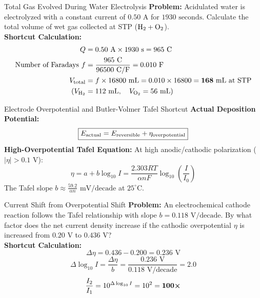 \documentclass[11pt,a4paper]{report}
\newcommand{\ans}[1]{\ifmmode\bm{#1}\else\textbf{#1}\fi}
\begin{document}
\begin{microbox}{Total Gas Evolved During Water Electrolysis}
\textbf{Problem:} Acidulated water is electrolyzed with a constant current of $0.50\text{ A}$ for $1930\text{ seconds}$. Calculate the total volume of wet gas collected at STP ($\ce{H2 + O2}$).\\
\textbf{Shortcut Calculation:}
\begin{align*}
Q &= 0.50\text{ A} \times 1930\text{ s} = 965\text{ C} \\
\text{Number of Faradays } f &= \frac{965\text{ C}}{96500\text{ C/F}} = 0.010\text{ F} \\
V_{\rm total} &= f \times 16800\text{ mL} = 0.010 \times 16800 = \ans{168\text{ mL at STP}} \\
(V_{\ce{H2}} &= 112\text{ mL}, \quad V_{\ce{O2}} = 56\text{ mL})
\end{align*}
\end{microbox}

\begin{shortcutbox}{Electrode Overpotential and Butler-Volmer Tafel Shortcut}
\textbf{Actual Deposition Potential:}
\begin{equation}
\boxed{
E_{\rm actual} = E_{\rm reversible} + \eta_{\rm overpotential}
}
\end{equation}
\textbf{High-Overpotential Tafel Equation:}
At high anodic/cathodic polarization ($|\eta| > 0.1\text{ V}$):
\begin{equation}
\boxed{
\eta = a + b \log_{10} I = \frac{2.303 RT}{\alpha n F} \log_{10}\left(\frac{I}{I_0}\right)
}
\end{equation}
The Tafel slope $b \approx \frac{59.2}{\alpha n}\text{ mV/decade}$ at $25^\circ\text{C}$.
\end{shortcutbox}

\begin{microbox}{Current Shift from Overpotential Shift}
\textbf{Problem:} An electrochemical cathode reaction follows the Tafel relationship with slope $b = 0.118\text{ V/decade}$. By what factor does the net current density increase if the cathodic overpotential $\eta$ is increased from $0.20\text{ V}$ to $0.436\text{ V}$?\\
\textbf{Shortcut Calculation:}
$$\Delta \eta = 0.436 - 0.200 = 0.236\text{ V}$$
$$\Delta \log_{10} I = \frac{\Delta \eta}{b} = \frac{0.236\text{ V}}{0.118\text{ V/decade}} = 2.0$$
$$\frac{I_2}{I_1} = 10^{\Delta \log_{10} I} = 10^2 = \ans{100\times}$$
\end{microbox}
\end{document}
